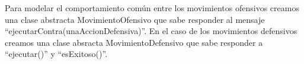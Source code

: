Para modelar el comportamiento común entre los movimientos ofensivos creamos una clase abstracta MovimientoOfensivo que sabe responder al mensaje ``ejecutarContra(unaAccionDefensiva)''. En el caso de los movimientos defensivos creamos una clase absracta MovimientoDefensivo que sabe responder a ``ejecutar()'' y ``esExitoso()''. 
